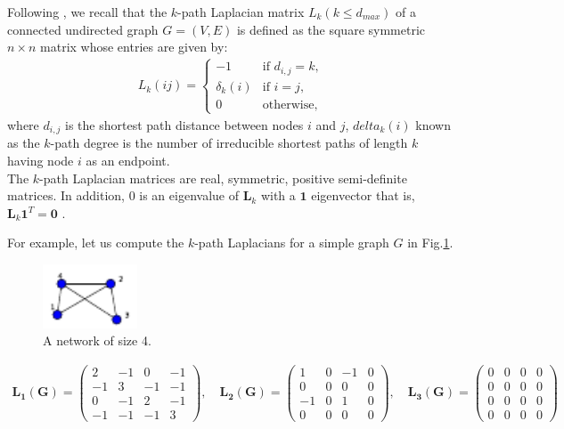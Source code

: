 \documentclass[12pt]{article}
\begin{document}
Following \citep{estrada2017path}, we recall that the $k$-path Laplacian matrix $L_k(k \leq d_{max})$ of a connected undirected graph $G=(V,E)$ is defined as the square symmetric $n \times n$ matrix whose entries are given by:
	\begin{eqnarray}
	L_k(ij) = \begin{cases} -1 &\mbox{if } d_{i,j} = k, \\
	\delta_k(i) &\mbox{if } i = j,  \\
	0 & \text{otherwise},
	\end{cases}
	\end{eqnarray}\label{k-laplacian}
	where $d_{i,j}$ is the shortest path distance between nodes $i$ and $j$, $delta_{k}(i)$ known as the $k$-path degree is the number of irreducible shortest paths of length $k$ having node $i$ as an endpoint.\\
	
	The $k$-path Laplacian matrices are real, symmetric, positive semi-definite matrices. In addition, $0$ is an eigenvalue of $\mathbf{L}_k$ with a $\mathbf{1}$ eigenvector that is, $\mathbf{L}_k \mathbf{1}^T = \mathbf{0}$ \citep{estrada2012path}.
	
For example, let us compute the $k$-path Laplacians for a simple graph $G$ in Fig.\ref{spanning}.

\begin{figure}[H]
	\centering
	\includegraphics[width=0.25\textwidth]{images/compute-spanning.pdf}
	\caption{ A network of size 4.}
	\label{spanning}
\end{figure}


\begin{eqnarray*}
	\mathbf{L_1(G)} = \begin{pmatrix}
		2 & -1 & 0 & -1 \\
		-1 & 3 & -1 & -1 \\
		0 & -1 & 2 & -1  \\
		-1 & -1 & -1 & 3
	\end{pmatrix}, \quad
	\mathbf{L_2(G)} = \begin{pmatrix}
		1 & 0 & -1 & 0 \\
		0 & 0 & 0 & 0 \\
		-1 & 0 & 1 & 0 \\
		0 & 0 & 0 & 0
	\end{pmatrix}, \quad
	\mathbf{L_3(G)} = \begin{pmatrix}
		0 & 0 & 0 & 0 \\
		0 & 0 & 0 & 0 \\
		0 & 0 & 0 & 0 \\
		0 & 0 & 0 & 0
	\end{pmatrix}
\end{eqnarray*}
\end{document}

